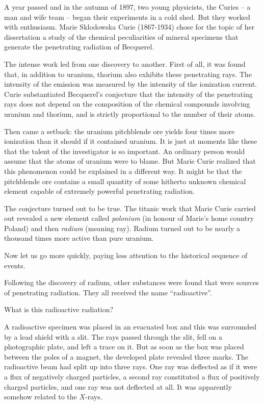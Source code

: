 A year passed and in the autumn of 1897, two young physicists, the Curies -- a man and wife team -- began their experiments in a cold shed. But they worked with enthu­siasm. Marie Sklodowska Curie (1867-1934) chose for the topic of her dissertation a study of the chemical pecu­liarities of mineral specimens that generate the penetrat­ing radiation of Becquerel.

The intense work led from one discovery to another. First of all, it was found that, in addition to uranium, thorium also exhibits these penetrating rays. The inten­sity of the emission was measured by the intensity of the ionization current. Curie substantiated Becquerel’s con­jecture that the intensity of the penetrating rays does not depend on the composition of the chemical compounds involving uranium and thorium, and is strictly propor­tional to the number of their atoms.

Then came a setback: the uranium pitchblende ore yields four times more ionization than it should if it contained uranium. It is just at moments like these that the talent of the investigator is so important. An ordinary person would assume that the atoms of uranium were to blame. But Marie Curie realized that this phenomenon could be explained in a different way. It might be that the pitchblende ore contains a small quantity of some hitherto unknown chemical element capable of extremely powerful penetrating radiation.

The conjecture turned out to be true. The titanic work that Marie Curie carried out revealed a new element called \emph{polonium} (in honour of Marie’s home country Poland) and then \emph{radium} (meaning ray). Radium turned out to be nearly a thousand times more active than pure uranium.

Now let us go more quickly, paying less attention to the historical sequence of events.

Following the discovery of radium, other substances were found that were sources of penetrating radiation. They all received the name ``radioactive''.

What is this radioactive radiation?

A radioactive specimen was placed in an evacuated box and this was surrounded by a lead shield with a slit. The rays passed through the slit, fell on a photographic plate, and left a trace on it. But as soon as the box was placed between the poles of a magnet, the devel­oped plate revealed three marks. The radioactive beam had split up into three rays. One ray was deflected as if it were a flux of negatively charged particles, a second ray constituted a flux of positively charged particles, and one ray was not deflected at all. It was apparently somehow related to the $X$-rays.


